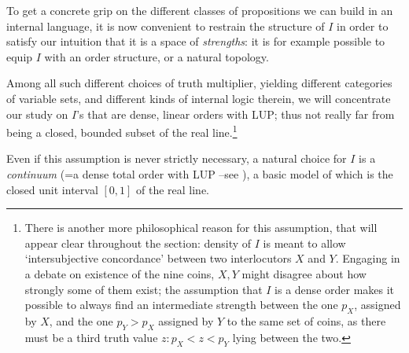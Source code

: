 \begin{remark}\label{something_on_I}
	To get a concrete grip on the different classes of propositions we  can build in an internal language, it is now convenient to restrain the structure of $I$ in order to satisfy our intuition that it is a space of \emph{strengths}: it is for example possible to equip $I$ with an order structure, or a natural topology.

	Among all such different choices of truth multiplier, yielding different categories of variable sets, and different kinds of internal logic therein, we will concentrate our study on $I$'s that are dense, linear orders with LUP; thus not really far from being a closed, bounded subset of the real line.\footnote{There is another more philosophical reason for this assumption, that will appear clear throughout the section: density of $I$ is meant to allow `intersubjective concordance' between two interlocutors $X$ and $Y$. Engaging in a debate on existence of the nine coins, $X,Y$ might disagree about how strongly some of them exist; the assumption that $I$ is a dense order makes it possible to always find an intermediate strength between the one $p_X$, assigned by $X$, and the one $p_Y > p_X$ assigned by $Y$ to the same set of coins, as there must be a third truth value $z:p_X < z < p_Y$ lying between the two.}
\end{remark}
Even if this assumption is never strictly necessary, a natural choice for $I$ is a \emph{continuum} (=a dense total order with LUP --see \cite{moschovakis2009descriptive}), a basic model of which is the closed unit interval $[0,1]$ of the real line.

